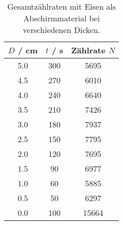 \begin{table}[!htp]
\centering
\caption{Gesamtzählraten mit Eisen als Abschirmmaterial bei verschiedenen Dicken.}
\label{tab:eisen}
\begin{tabular}{S[table-format=1.1] S[table-format=3.0] S[table-format=5.0]}
\toprule
{$D$ / cm} & {$t$ / s} & {Zählrate $N$} \\
 & 300 &  5695 \\
4.5 & 270 &  6010 \\
4.0 & 240 &  6640 \\
3.5 & 210 &  7426 \\
3.0 & 180 &  7937 \\
2.5 & 150 &  7795 \\
2.0 & 120 &  7695 \\
1.5 &  90 &  6977 \\
1.0 &  60 &  5885 \\
0.5 &  50 &  6297 \\
0.0 & 100 & 15664 \\
\bottomrule
\end{tabular}
\end{table}